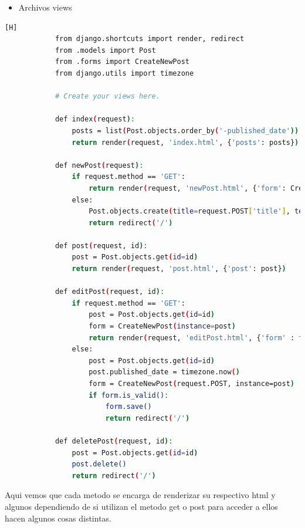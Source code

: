 \documentclass{article}
\begin{document}
	\begin{itemize}	
		\item Archivos views
	\end{itemize}
	\begin{lstlisting}[language=bash,caption={views.py}][H]
            from django.shortcuts import render, redirect
            from .models import Post
            from .forms import CreateNewPost
            from django.utils import timezone
            
            # Create your views here.
            
            def index(request):
                posts = list(Post.objects.order_by('-published_date'))
                return render(request, 'index.html', {'posts': posts})
            
            def newPost(request):
                if request.method == 'GET':
                    return render(request, 'newPost.html', {'form': CreateNewPost()})
                else:
                    Post.objects.create(title=request.POST['title'], text=request.POST['text'], published_date=timezone.now())
                    return redirect('/')
            
            def post(request, id):
                post = Post.objects.get(id=id)
                return render(request, 'post.html', {'post': post})
            
            def editPost(request, id):
                if request.method == 'GET':
                    post = Post.objects.get(id=id)
                    form = CreateNewPost(instance=post)
                    return render(request, 'editPost.html', {'form' : form})
                else:
                    post = Post.objects.get(id=id)
                    post.published_date = timezone.now()
                    form = CreateNewPost(request.POST, instance=post)
                    if form.is_valid():
                        form.save()
                        return redirect('/')
            
            def deletePost(request, id):
                post = Post.objects.get(id=id)
                post.delete()
                return redirect('/')
	\end{lstlisting}
        Aqui vemos que cada metodo se encarga de renderizar su respectivo html y algunos dependiendo de si utilizan el metodo get o post para acceder a ellos hacen algunos cosas distintas.
\end{document}
